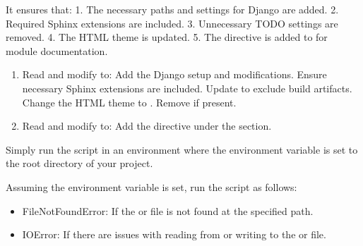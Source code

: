 \documentclass[letterpaper,10pt,english]{sphinxmanual}
\begin{document}
\sphinxAtStartPar
It ensures that:
1. The necessary paths and settings for Django are added.
2. Required Sphinx extensions are included.
3. Unnecessary TODO settings are removed.
4. The HTML theme is updated.
5. The  directive is added to  for module documentation.
\begin{description}
\begin{enumerate}
%
\item {} 
\sphinxAtStartPar
Read and modify  to:
\sphinxhyphen{} Add the Django setup and  modifications.
\sphinxhyphen{} Ensure necessary Sphinx extensions are included.
\sphinxhyphen{} Update  to exclude build artifacts.
\sphinxhyphen{} Change the HTML theme to .
\sphinxhyphen{} Remove  if present.

\item {} 
\sphinxAtStartPar
Read and modify  to:
\sphinxhyphen{} Add the  directive under the  section.

\end{enumerate}

\sphinxAtStartPar
Simply run the script in an environment where the  environment variable 
is set to the root directory of your project.

\sphinxAtStartPar
Assuming the  environment variable is set, run the script as follows:

\sphinxAtStartPar
{}

\begin{itemize}
\item {} 
\sphinxAtStartPar
FileNotFoundError: If the  or  file is not found at the specified path.

\item {} 
\sphinxAtStartPar
IOError: If there are issues with reading from or writing to the  or  file.

\end{itemize}


\end{description}
\end{document}
